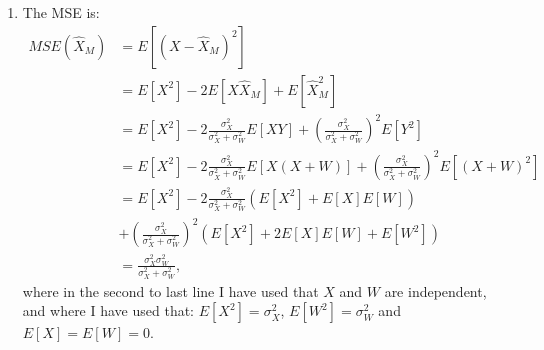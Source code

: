 \begin{problem}{7}
\begin{enumerate}
\item The MSE is:
\begin{align*}
MSE(\hat X_M) &= E[(X - \hat X_M)^2]\\
&= E[X^2]-2E[X\hat X_M]+E[\hat X_M^2]\\
& = E[X^2]-2\frac{\sigma_X^2}{\sigma_X^2+\sigma_W^2}E\left [XY\right]+\left(\frac{\sigma_X^2}{\sigma_X^2+\sigma_W^2}\right)^2E\left[Y^2\right]\\
& = E[X^2]-2\frac{\sigma_X^2}{\sigma_X^2+\sigma_W^2}E\left [X(X+W)\right]+\left(\frac{\sigma_X^2}{\sigma_X^2+\sigma_W^2} \right)^2E\left[(X+W)^2\right]\\
& = E[X^2]-2\frac{\sigma_X^2}{\sigma_X^2+\sigma_W^2}\left( E[X^2]+E[X]E[W] \right)\\
& +\left(\frac{\sigma_X^2}{\sigma_X^2+\sigma_W^2} \right)^2\left (E[X^2]+2E[X]E[W]+E[W^2] \right )\\
& = \frac{\sigma_X^2 \sigma_W^2}{\sigma_X^2+\sigma_W^2},
\end{align*}
where in the second to last line I have used that $X$ and $W$ are independent, and where I have used that: $E[X^2] = \sigma_X^2 $, $E[W^2] = \sigma_W^2 $ and $E[X]=E[W]=0$.

\end{enumerate}
\end{problem}


